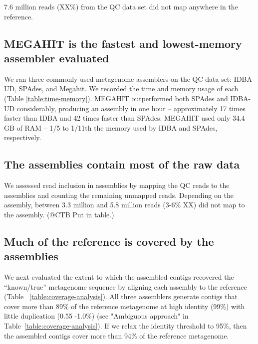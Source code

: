 \documentclass[10pt,a4paper,twocolumn]{article}
\begin{document}

7.6 million reads (XX\%) from the QC data set did not map anywhere in
the reference.

\subsection*{MEGAHIT is the fastest and lowest-memory assembler evaluated}

We ran three commonly used metagenome assemblers on the QC data set:
IDBA-UD, SPAdes, and Megahit. We recorded the time and memory usage of
each (Table \ref{table:time-memory}).  MEGAHIT outperformed both
SPAdes and IDBA-UD considerably, producing an assembly in one hour --
approximately 17 times faster than IDBA and 42 times faster than
SPAdes.  MEGAHIT used only 34.4 GB of RAM -- 1/5 to 1/11th
the memory used by IDBA and SPAdes, respectively.

\subsection*{The assemblies contain most of the raw data}

We assessed read inclusion in assemblies by mapping the QC reads to
the assemblies and counting the remaining unmapped reads. Depending on
the assembly, between 3.3 million and 5.8 million reads (3-6\% XX)
did not map to the assembly. (@CTB Put in table.)



\subsection*{Much of the reference is covered by the assemblies}

We next evaluated the extent to which the assembled contigs recovered the
``known/true'' metagenome sequence by aligning each assembly to the
reference (Table ~\ref{table:coverage-analysis}).  All three
assemblers generate contigs that cover more than 89\% of the reference
metagenome at high identity (99\%) with little duplication
(0.55 -1.0\%) (see "Ambiguous approach" in
Table~\ref{table:coverage-analysis}).  If we relax the identity
threshold to 95\%, then the assembled contigs cover more than 94\% of
the reference metagenome.
\end{document}
